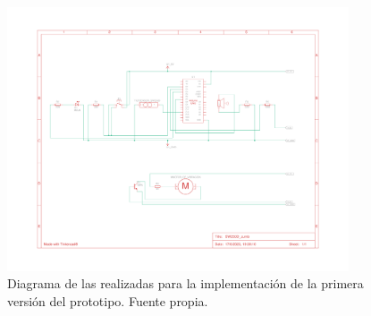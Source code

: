 \begin{figure}[h]
    \centering
    \includegraphics[width=0.9\textwidth]{img/Prot_V1_Esquema.pdf}
    \caption{Diagrama de las realizadas para la implementación de la primera versión del prototipo. Fuente propia.}
    \label{fig:ProtV1_esquema} 
\end{figure}


